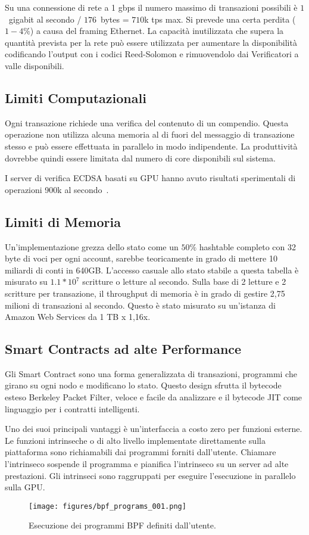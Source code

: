 \documentclass[12pt]{article}
\begin{document}
Su una connessione di rete a 1 gbps il numero massimo di transazioni possibili è $1$~gigabit al secondo / $176$~bytes = $710$k tps max. Si prevede una certa perdita ($1-4\%$) a causa del framing Ethernet. La capacità inutilizzata che supera la quantità prevista per la rete può essere utilizzata per aumentare la disponibilità codificando l'output con i codici Reed-Solomon e rimuovendolo dai Verificatori a valle disponibili.
\subsection{Limiti Computazionali}
Ogni transazione richiede una verifica del contenuto di un compendio. Questa operazione non utilizza alcuna memoria al di fuori del messaggio di transazione stesso e può essere effettuata in parallelo in modo indipendente. La produttività dovrebbe quindi essere limitata dal numero di core disponibili sul sistema.

I server di verifica ECDSA basati su GPU hanno avuto risultati sperimentali di operazioni 900k al secondo~\cite{gpuecc}.
\subsection{Limiti di Memoria}
Un'implementazione grezza dello stato come un \(50\%\) hashtable completo con 32 byte di voci per ogni account, sarebbe teoricamente in grado di mettere 10 miliardi di conti in 640GB. L'accesso casuale allo stato stabile a questa tabella è misurato su \(1.1 * 10^7\) scritture o letture al secondo. Sulla base di 2 letture e 2 scritture per transazione, il throughput di memoria è in grado di gestire 2,75 milioni di transazioni al secondo. Questo è stato misurato su un'istanza di Amazon Web Services da 1 TB x 1,16x.

\subsection{Smart Contracts ad alte Performance}\label{sec:smartcontracts}

Gli Smart Contract sono una forma generalizzata di transazioni, programmi che girano su ogni nodo e modificano lo stato. Questo design sfrutta il bytecode esteso Berkeley Packet Filter, veloce e facile da analizzare e il bytecode JIT come linguaggio per i contratti intelligenti.

Uno dei suoi principali vantaggi è un'interfaccia a costo zero per funzioni esterne. Le funzioni intrinseche o di alto livello implementate direttamente sulla piattaforma sono richiamabili dai programmi forniti dall'utente. Chiamare l'intrinseco sospende il programma e pianifica l'intrinseco su un server ad alte prestazioni. Gli intrinseci sono raggruppati per eseguire l'esecuzione in parallelo sulla GPU.
\begin{figure}
  \begin{center}
    \centering
    \texttt{[image: figures/bpf\_programs\_001.png]}
    \caption[Fig 11]{Esecuzione dei programmi BPF definiti dall'utente.\label{fig_11}}
  \end{center}
  \end{figure}
\end{document}
